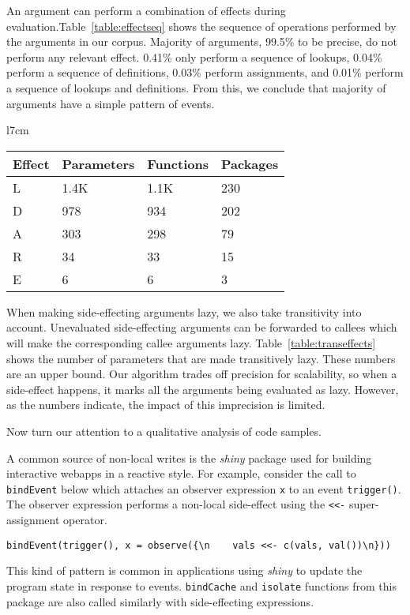 \documentclass[review,nonacm,screen,acmsmall,anonymous=true]{acmart}
\newcommand{\code}[1]{\lstinline |#1|\xspace}
\begin{document}
An argument can perform a combination of effects during
evaluation.Table~\ref{table:effectseq} shows the sequence of operations
performed by the arguments in our corpus. Majority of arguments, 99.5\% to be
precise, do not perform any relevant effect. 0.41\% only perform a sequence of
lookups, 0.04\% perform a sequence of definitions, 0.03\% perform assignments,
and 0.01\% perform a sequence of lookups and definitions. From this, we conclude
that majority of arguments have a simple pattern of events.
%
\begin{wraptable}{l}{7cm}
  \small
  \centering
  \caption{Transitive Effects} \label{table:transeffects}
  \begin{tabular}{llll}
    \toprule
    \textbf{Effect}&\textbf{Parameters}&\textbf{Functions}&\textbf{Packages}\\
    \midrule
    L&1.4K&1.1K&230\\
    D&978&934&202\\
    A&303&298&79\\
    R&34&33&15\\
    E&6&6&3\\
    \bottomrule
  \end{tabular}
\end{wraptable}
When making side-effecting arguments lazy, we also take transitivity into
account. Unevaluated side-effecting arguments can be forwarded to callees which
will make the corresponding callee arguments lazy. Table~\ref{table:transeffects}
shows the number of parameters that are made transitively lazy. These numbers
are an upper bound. Our algorithm trades off precision for scalability, so when
a side-effect happens, it marks all the arguments being evaluated as lazy.
However, as the numbers indicate, the impact of this imprecision is limited.

Now turn our attention to a qualitative analysis of code samples.

A common source of non-local writes is the \emph{shiny} package used for
building interactive webapps in a reactive style. For example, consider the call
to \code{bindEvent} below which attaches an observer expression \code{x} to an
event \code{trigger()}. The observer expression performs a non-local side-effect
using the \code{<<-} super-assignment operator.
%
\begin{lstlisting}
bindEvent(trigger(), x = observe({\n    vals <<- c(vals, val())\n}))
\end{lstlisting}
%
This kind of pattern is common in applications using \emph{shiny} to update the
program state in response to events. \code{bindCache} and
\code{isolate} functions from this package are also called similarly with
side-effecting expressions.
\end{document}
